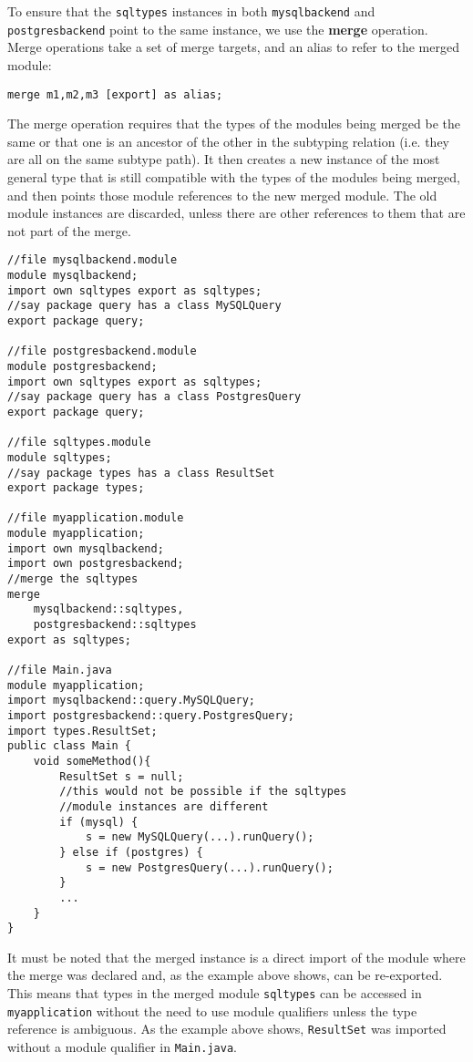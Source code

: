 To ensure that the {\tt sqltypes} instances in both {\tt mysqlbackend}
and {\tt postgresbackend} point to the same instance, we use the 
\textbf{merge} operation. Merge operations take a set of merge targets,
and an alias to refer to the merged module:

\begin{lstlisting}
merge m1,m2,m3 [export] as alias;
\end{lstlisting}

The merge operation requires that the types
of the modules being merged be the same or that one is an ancestor of
the other in the subtyping relation (i.e. they are all on the same subtype path). 
It then creates a new instance
of the most general type that is still compatible with the types of the
modules being merged, and then points those module references to the new 
merged module. The old module instances are discarded, unless there
are other references to them that are not part of the merge.

\begin{lstlisting}[caption=Merge]
//file mysqlbackend.module
module mysqlbackend;
import own sqltypes export as sqltypes;
//say package query has a class MySQLQuery
export package query;

//file postgresbackend.module
module postgresbackend;
import own sqltypes export as sqltypes;
//say package query has a class PostgresQuery
export package query;

//file sqltypes.module
module sqltypes;
//say package types has a class ResultSet
export package types;

//file myapplication.module
module myapplication;
import own mysqlbackend;
import own postgresbackend;
//merge the sqltypes
merge 
	mysqlbackend::sqltypes, 
	postgresbackend::sqltypes 
export as sqltypes;

//file Main.java
module myapplication;
import mysqlbackend::query.MySQLQuery;
import postgresbackend::query.PostgresQuery;
import types.ResultSet;
public class Main {
	void someMethod(){
		ResultSet s = null;
		//this would not be possible if the sqltypes
		//module instances are different
		if (mysql) {
			s = new MySQLQuery(...).runQuery();
		} else if (postgres) {
			s = new PostgresQuery(...).runQuery();
		}
		...
	}
}
\end{lstlisting}


It must be noted that the merged instance is a direct import of
the module where the merge was declared and, as the example above shows,
can be re-exported. This means that types in the merged module {\tt sqltypes} 
can be accessed in {\tt myapplication} without the need to use module 
qualifiers unless the type reference is ambiguous. As the example above
shows, {\tt ResultSet} was imported without a module qualifier in
{\tt Main.java}.

